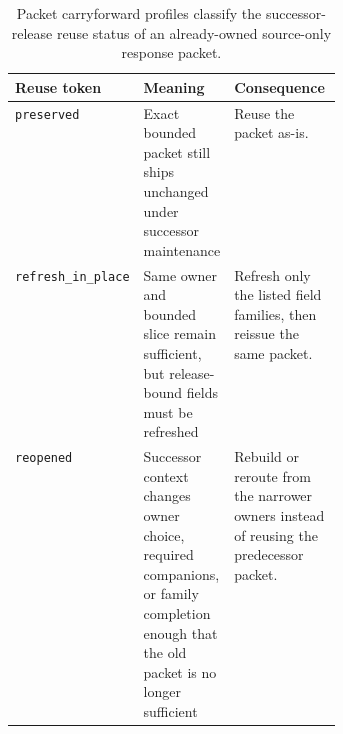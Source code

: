\documentclass[11pt]{article}
\begin{document}
\begin{table}[t]
\centering
\footnotesize
\setlength{\tabcolsep}{2pt}
\begin{tabularx}{\linewidth}{@{}>{\raggedright\arraybackslash}p{0.18\linewidth}>{\raggedright\arraybackslash}p{0.20\linewidth}>{\raggedright\arraybackslash}X@{}}
\toprule
Reuse token & Meaning & Consequence \\
\midrule
\texttt{preserved} & Exact bounded packet still ships unchanged under successor maintenance & Reuse the packet as-is. \\
\texttt{refresh\_in\_place} & Same owner and bounded slice remain sufficient, but release-bound fields must be refreshed & Refresh only the listed field families, then reissue the same packet. \\
\texttt{reopened} & Successor context changes owner choice, required companions, or family completion enough that the old packet is no longer sufficient & Rebuild or reroute from the narrower owners instead of reusing the predecessor packet. \\
\bottomrule
\end{tabularx}
\caption{Packet carryforward profiles classify the successor-release reuse status of an already-owned source-only response packet.}
\label{tab:publicrequestresponsepacketcarryforward}
\end{table}
\end{document}
